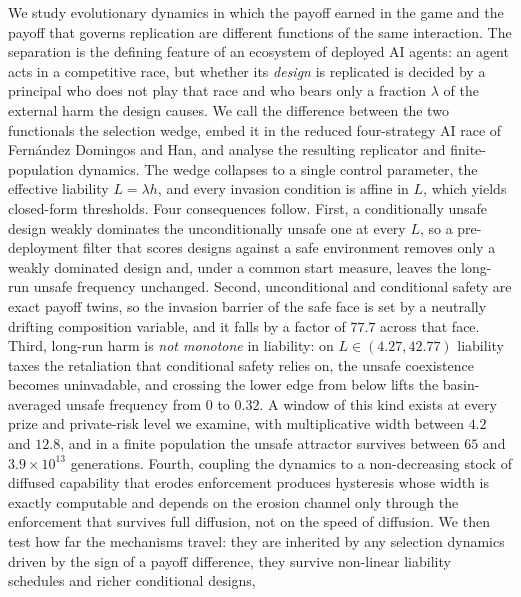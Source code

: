 \noindent
We study evolutionary dynamics in which the payoff earned in the game and the
payoff that governs replication are different functions of the same
interaction. The separation is the defining feature of an ecosystem of
deployed AI agents: an agent acts in a competitive race, but whether its
\emph{design} is replicated is decided by a principal who does not play that
race and who bears only a fraction $\lambda$ of the external harm the design
causes. We call the difference between the two functionals the selection
wedge, embed it in the reduced four-strategy AI race of Fern\'andez Domingos
and Han, and analyse the resulting replicator and finite-population dynamics.
The wedge collapses to a single control parameter, the effective liability
$L=\lambda h$, and every invasion condition is affine in $L$, which yields
closed-form thresholds. Four consequences follow. First, a conditionally
unsafe design weakly dominates the unconditionally unsafe one at every $L$, so
a pre-deployment filter that scores designs against a safe environment removes
only a weakly dominated design and, under a common start measure, leaves the
long-run unsafe frequency unchanged. Second, unconditional and conditional
safety are exact payoff twins, so the invasion barrier of the safe face is set
by a neutrally drifting composition variable, and it falls by a factor of
$77.7$ across that face. Third, long-run harm is \emph{not monotone} in
liability: on $L\in(4.27,42.77)$ liability taxes the retaliation that
conditional safety relies on, the unsafe coexistence becomes uninvadable, and
crossing the lower edge from below lifts the basin-averaged unsafe frequency
from $0$ to $0.32$. A window of this kind exists at every prize and
private-risk level we examine, with multiplicative width between $4.2$ and
$12.8$, and in a finite population the unsafe attractor survives between $65$ and
$3.9\times10^{13}$ generations. Fourth, coupling the dynamics to a
non-decreasing stock of diffused capability that erodes enforcement produces
hysteresis whose width is exactly computable and depends on the erosion
channel only through the enforcement that survives full diffusion, not on the
speed of diffusion. We then test how far the mechanisms travel: they are
inherited by any selection dynamics driven by the sign of a payoff difference,
they survive non-linear liability schedules and richer conditional designs,
